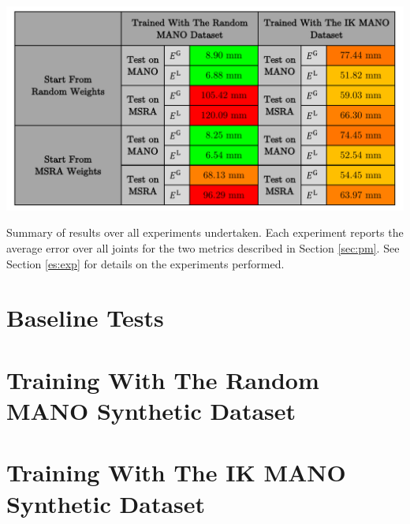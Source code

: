\begin{table}[!ht]
        \centering
        \includegraphics[width=\linewidth]{figs/general/results.pdf}
        \caption{Summary of results over all experiments undertaken. Each experiment reports the average error over all joints for the two metrics described in Section \ref{sec:pm}. See Section \ref{es:exp} for details on the experiments performed.}
    \end{table}


\label{ap:fullres}
\setlength{\tabcolsep}{0.05cm}
\FloatBarrier\section{Baseline Tests}
\label{sec:ap:base}




\FloatBarrier\section{Training With The Random MANO Synthetic Dataset}
\label{sec:ap:mano}





\FloatBarrier\section{Training With The IK MANO Synthetic Dataset}
\label{sec:ap:maya}





% 

